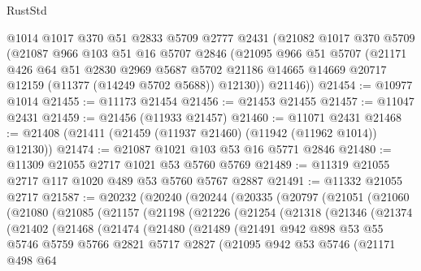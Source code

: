 \begin{lexlean}{RustStd}
\begin{coremodule}
    @1014
    @1017
    @370
    @51
    @2833
    @5709
    @2777
    @2431
    (@21082
      @1017
      @370
      @5709
      (@21087
        @966
        @103
        @51
        @16
        @5707
        @2846
        (@21095
          @966
          @51
          @5707
          (@21171
            @426
            @64
            @51
            @2830
            @2969
            @5687
            @5702
            @21186
            @14665
            @14669
            @20717
            @12159
            (@11377 (@14249 @5702 @5688))
            @12130))
        @21146))
@21454 := @10977 @1014
@21455 := @11173 @21454
@21456 := @21453 @21455
@21457 := @11047 @2431
@21459 := @21456 (@11933 @21457)
@21460 := @11071 @2431
@21468 := @21408 (@21411 (@21459 (@11937 @21460) (@11942 (@11962 @1014)) @12130))
@21474 := @21087 @1021 @103 @53 @16 @5771 @2846
@21480 := @11309 @21055 @2717 @1021 @53 @5760 @5769
@21489 := @11319 @21055 @2717 @117 @1020 @489 @53 @5760 @5767 @2887
@21491 := @11332 @21055 @2717
@21587 := @20232
    (@20240
      (@20244
        (@20335
          (@20797
            (@21051
              (@21060
                (@21080
                  (@21085
                    (@21157
                      (@21198
                        (@21226
                          (@21254
                            (@21318
                              (@21346
                                (@21374
                                  (@21402
                                    (@21468
                                      (@21474
                                        (@21480
                                          (@21489
                                            (@21491
                                              @942
                                              @898
                                              @53
                                              @55
                                              @5746
                                              @5759
                                              @5766
                                              @2821
                                              @5717
                                              @2827
                                              (@21095
                                                @942
                                                @53
                                                @5746
                                                (@21171
                                                  @498
                                                  @64

\end{coremodule}
\end{lexlean}

